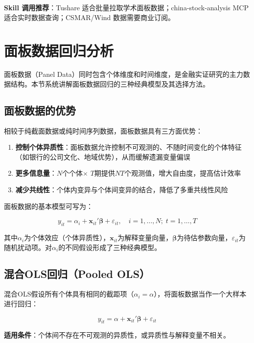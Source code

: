 \textbf{Skill 调用推荐}：Tushare 适合批量拉取学术面板数据；china-stock-analysis MCP 适合实时数据查询；CSMAR/Wind 数据需要商业订阅。

\section{面板数据回归分析}
\label{sec:panel}

面板数据（Panel Data）同时包含个体维度和时间维度，是金融实证研究的主力数据结构。本节系统讲解面板数据回归的三种经典模型及其选择方法。

\subsection{面板数据的优势}

相较于纯截面数据或纯时间序列数据，面板数据具有三方面优势：

\begin{enumerate}[leftmargin=2em]
  \item \textbf{控制个体异质性}：面板数据允许控制不可观测的、不随时间变化的个体特征（如银行的公司文化、地域优势），从而缓解遗漏变量偏误
  \item \textbf{更多信息量}：$N$个个体$\times$ $T$期提供$NT$个观测值，增大自由度，提高估计效率
  \item \textbf{减少共线性}：个体内变异与个体间变异的结合，降低了多重共线性风险
\end{enumerate}

面板数据的基本模型可写为：

\[
y_{it} = \alpha_i + \mathbf{x}_{it}'\boldsymbol{\beta} + \varepsilon_{it}, \quad i=1,\ldots,N;\; t=1,\ldots,T
\]

其中$\alpha_i$为个体效应（个体异质性），$\mathbf{x}_{it}$为解释变量向量，$\boldsymbol{\beta}$为待估参数向量，$\varepsilon_{it}$为随机扰动项。对$\alpha_i$的不同假设形成了三种经典模型。

\subsection{混合OLS回归（Pooled OLS）}

混合OLS假设所有个体具有相同的截距项（$\alpha_i = \alpha$），将面板数据当作一个大样本进行回归：

\[
y_{it} = \alpha + \mathbf{x}_{it}'\boldsymbol{\beta} + \varepsilon_{it}
\]

\textbf{适用条件}：个体间不存在不可观测的异质性，或异质性与解释变量不相关。

